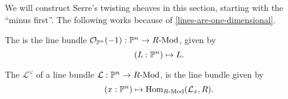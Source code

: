We will construct Serre's twisting sheaves in this section,
starting with the ``minus first''.
The following works because of \cref{lines-are-one-dimensional}.

\begin{definition}
  The  is the line bundle $\mathcal O_{\mathbb{P}^n}(-1):\mathbb{P}^n\to R\text{-}\mathrm{Mod}$,
  given by
  \[ (L:\bP^n)\mapsto L\rlap{.}\]
\end{definition}

\begin{definition}
  The  $\mathcal L^\vee$ of a line bundle $\mathcal L:\mathbb{P}^n\to R\text{-}\mathrm{Mod}$,
  is the line bundle given by
  \[ (x:\bP^n)\mapsto \Hom_{\Mod{R}}(\mathcal L_x,R)\rlap{.}\]
\end{definition}
